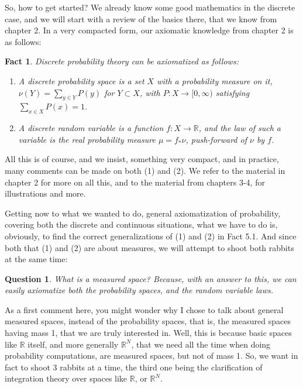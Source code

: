 \documentclass[12pt]{amsbook}
\newtheorem{fact}[theorem]{Fact}
\newtheorem{question}[theorem]{Question}
\begin{document}
\bigskip

So, how to get started? We already know some good mathematics in the discrete case, and we will start with a review of the basics there, that we know from chapter 2. In a very compacted form, our axiomatic knowledge from chapter 2 is as follows:


\begin{fact}
Discrete probability theory can be axiomatized as follows:
\begin{enumerate}
\item A discrete probability space is a set $X$ with a probability measure on it, $\nu(Y)=\sum_{y\in Y}P(y)$ for $Y\subset X$, with $P:X\to[0,\infty)$ satisfying $\sum_{x\in X}P(x)=1$.

\item A discrete random variable is a function $f:X\to\mathbb R$, and the law of such a variable is the real probability measure $\mu=f_*\nu$, push-forward of $\nu$ by $f$.
\end{enumerate}
\end{fact}

All this is of course, and we insist, something very compact, and in practice, many comments can be made on both (1) and (2). We refer to the material in chapter 2 for more on all this, and to the material from chapters 3-4, for illustrations and more.

\bigskip

Getting now to what we wanted to do, general axiomatization of probability, covering both the discrete and continuous situations, what we have to do is, obviously, to find the correct generalizations of (1) and (2) in Fact 5.1. And since both that (1) and (2) are about measures, we will attempt to shoot both rabbits at the same time:

\begin{question}
What is a measured space? Because, with an answer to this, we can easily axiomatize both the probability spaces, and the random variable laws.
\end{question}

As a first comment here, you might wonder why I chose to talk about general measured spaces, instead of the probability spaces, that is, the measured spaces having mass 1, that we are truly interested in. Well, this is because basic spaces like $\mathbb R$ itself, and more generally $\mathbb R^N$, that we need all the time when doing probability computations, are measured spaces, but not of mass 1. So, we want in fact to shoot 3 rabbits at a time, the third one being the clarification of integration theory over spaces like $\mathbb R$, or $\mathbb R^N$.
\end{document}
